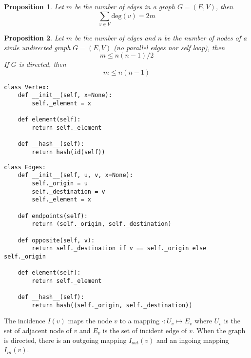 \documentclass[10pt]{article}
\newtheorem{prop}{Proposition}
\begin{document}
\begin{prop}
Let $m$ be the number of edges in a graph $G=(E, V)$, then 
\[
	\sum_{v\in V} \mathrm{deg}(v) = 2m
\]
\end{prop}

\begin{prop}
	Let $m$ be the number of edges and $n$ be the number of nodes of a simle undirected graph $G=(E, V)$ (no parallel edges nor self loop), then 
	\[
		m \leq n(n-1)/2  
	\]
	If $G$ is directed, then 
	\[
		m \leq n(n-1)
	\]
\end{prop}

\begin{verbatim}
class Vertex:
    def __init__(self, x=None):
        self._element = x
        
    def element(self):
        return self._element
    
    def __hash__(self):
        return hash(id(self))
\end{verbatim}

\begin{verbatim}
class Edges:
    def __init__(self, u, v, x=None):
        self._origin = u
        self._destination = v
        self._element = x
        
    def endpoints(self):
        return (self._origin, self._destination)
        
    def opposite(self, v):
        return self._destination if v == self._origin else self._origin
    
    def element(self):
        return self._element
    
    def __hash__(self):
        return hash((self._origin, self._destination))
\end{verbatim}

The incidence $I(v)$ maps the node $v$ to a mapping $\cdot \colon U_v \mapsto E_v$ where $U_v$ is the set of adjacent node of $v$ and $E_v$ is the set of incident edge of $v$. When the graph is directed, there is an outgoing mapping $I_{out}(v)$ and an ingoing mapping $I_{in}(v)$.
\end{document}
